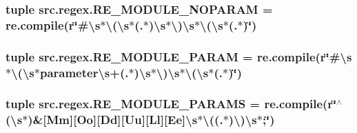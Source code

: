 \hypertarget{namespacesrc_1_1regex_a136b550c5e9a55c8efb6c5596a23d114}{
\subsubsection[{R\-E\-\_\-\-M\-O\-D\-U\-L\-E\-\_\-\-N\-O\-P\-A\-R\-A\-M}]{\setlength{\rightskip}{0pt plus 5cm}tuple src.\-regex.\-R\-E\-\_\-\-M\-O\-D\-U\-L\-E\-\_\-\-N\-O\-P\-A\-R\-A\-M = re.\-compile(r\char`\"{}\#\textbackslash{}s$\ast$\textbackslash{}(\textbackslash{}s$\ast$(.$\ast$)\textbackslash{}s$\ast$\textbackslash{})\textbackslash{}s$\ast$\textbackslash{}(\textbackslash{}s$\ast$(.$\ast$)\char`\"{})}}\label{namespacesrc_1_1regex_a136b550c5e9a55c8efb6c5596a23d114}
\hypertarget{namespacesrc_1_1regex_a1e2e4b186a9cd0ebeab9281d6fecbbce}{
\subsubsection[{R\-E\-\_\-\-M\-O\-D\-U\-L\-E\-\_\-\-P\-A\-R\-A\-M}]{\setlength{\rightskip}{0pt plus 5cm}tuple src.\-regex.\-R\-E\-\_\-\-M\-O\-D\-U\-L\-E\-\_\-\-P\-A\-R\-A\-M = re.\-compile(r\char`\"{}\#\textbackslash{}s$\ast$\textbackslash{}(\textbackslash{}s$\ast$parameter\textbackslash{}s+(.$\ast$)\textbackslash{}s$\ast$\textbackslash{})\textbackslash{}s$\ast$\textbackslash{}(\textbackslash{}s$\ast$(.$\ast$)\char`\"{})}}\label{namespacesrc_1_1regex_a1e2e4b186a9cd0ebeab9281d6fecbbce}
\hypertarget{namespacesrc_1_1regex_ad4cf895752a1cdf4439bb4d565796b15}{
\subsubsection[{R\-E\-\_\-\-M\-O\-D\-U\-L\-E\-\_\-\-P\-A\-R\-A\-M\-S}]{\setlength{\rightskip}{0pt plus 5cm}tuple src.\-regex.\-R\-E\-\_\-\-M\-O\-D\-U\-L\-E\-\_\-\-P\-A\-R\-A\-M\-S = re.\-compile(r\char`\"{}$^\wedge$(\textbackslash{}s$\ast$)\&\mbox{[}Mm\mbox{]}\mbox{[}Oo\mbox{]}\mbox{[}Dd\mbox{]}\mbox{[}Uu\mbox{]}\mbox{[}Ll\mbox{]}\mbox{[}Ee\mbox{]}\textbackslash{}s$\ast$\textbackslash{}((.$\ast$)\textbackslash{})\textbackslash{}s$\ast$;\char`\"{})}}\label{namespacesrc_1_1regex_ad4cf895752a1cdf4439bb4d565796b15}
